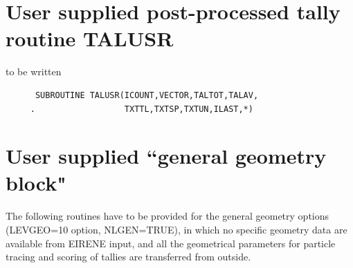 \section{User supplied post-processed tally routine TALUSR}
\label{sec3.7}

to be written

\begin{lstlisting}
      SUBROUTINE TALUSR(ICOUNT,VECTOR,TALTOT,TALAV,
     .                  TXTTL,TXTSP,TXTUN,ILAST,*)
\end{lstlisting}

\section{User supplied ``general geometry block"}
\label{sec3.8}

The following routines have to be provided for the general geometry options
(LEVGEO=10 option, NLGEN=TRUE), in which no specific geometry data are
available from EIRENE input, and all the geometrical parameters for particle
tracing and scoring of tallies are transferred from outside.


